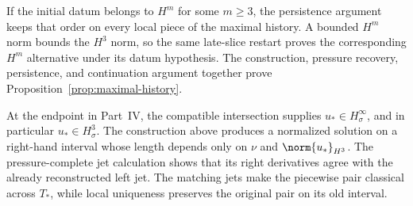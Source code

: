 If the initial datum belongs to \(H^m\) for some \(m\ge3\), the persistence argument keeps that order on every local piece of the maximal history.
A bounded \(H^m\) norm bounds the \(H^3\) norm, so the same late-slice restart proves the corresponding \(H^m\) alternative under its datum hypothesis.
The construction, pressure recovery, persistence, and continuation argument together prove Proposition~\ref{prop:maximal-history}.

At the endpoint in Part~IV, the compatible intersection supplies \(u_*\in H^\infty_\sigma\), and in particular \(u_*\in H^3_\sigma\).
The construction above produces a normalized solution on a right-hand interval whose length depends only on \(\nu\) and \(\norm{u_*}_{H^3}\).
The pressure-complete jet calculation shows that its right derivatives agree with the already reconstructed left jet.
The matching jets make the piecewise pair classical across \(T_*\), while local uniqueness preserves the original pair on its old interval.
